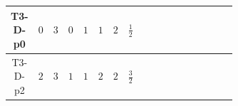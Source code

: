 \documentclass[8pt]{article}
\begin{document}
\begin{landscape}
\begin{longtable}{@{}cccccccc >{\raggedright\arraybackslash}p{0.21\linewidth} >{\raggedright\arraybackslash}p{0.21\linewidth} >{\raggedright\arraybackslash}p{0.21\linewidth}@{}}
T3-D-p0 & $0$ & $3$ & $0$ & $1$ & $1$ & $2$ & $\frac{1}{2}$ & \scriptsize\adjustbox{max width=\linewidth}{$\begin{gathered} -S_{1,j_1} S_{1,j_1}{}^{\dagger } m_1^2 \\ +\frac{1}{2} S_{1,j_3} S_{1,j_4} S_{1,j_1}{}^{\dagger } S_{1,j_2}{}^{\dagger } \mathcal{I}_{S_1,j_1,j_3,j_2,j_4}{}^1 \lambda_{S_1}^{(1)}^{(1)} \\ +\frac{1}{2} S_{1,j_3} S_{1,j_4} S_{1,j_1}{}^{\dagger } S_{1,j_2}{}^{\dagger } \mathcal{I}_{S_1,j_1,j_3,j_2,j_4}{}^2 \lambda_{S_1}^{(1)}^{(2)}\end{gathered}$} & \scriptsize\adjustbox{max width=\linewidth}{$\begin{gathered} +D_{\mu _1}\left(S_{1,j_1}\right){}^{\dagger } D_{\mu _1}\left(S_{1,j_1}\right)\end{gathered}$} & \scriptsize\adjustbox{max width=\linewidth}{$\begin{gathered} -m_2^2 S_2 S_2{}^{\dagger } \\ +\frac{1}{2} S_2^2 \left(S_2{}^{\dagger }\right){}^2 \lambda_{S_2}^{(1)}^{(1)}\end{gathered}$} \\
\midrule
T3-D-p2 & $2$ & $3$ & $1$ & $1$ & $2$ & $2$ & $\frac{3}{2}$ & \scriptsize\adjustbox{max width=\linewidth}{$\begin{gathered} -S_{1,j_1} S_{1,j_1}{}^{\dagger } m_1^2 \\ +\frac{1}{2} S_{1,j_3} S_{1,j_4} S_{1,j_1}{}^{\dagger } S_{1,j_2}{}^{\dagger } \mathcal{I}_{S_1,j_1,j_3,j_2,j_4}{}^1 \lambda_{S_1}^{(1)}^{(1)} \\ +\frac{1}{2} S_{1,j_3} S_{1,j_4} S_{1,j_1}{}^{\dagger } S_{1,j_2}{}^{\dagger } \mathcal{I}_{S_1,j_1,j_3,j_2,j_4}{}^2 \lambda_{S_1}^{(1)}^{(2)}\end{gathered}$} & \scriptsize\adjustbox{max width=\linewidth}{$\begin{gathered} +D_{\mu _1}\left(S_{1,j_1}\right){}^{\dagger } D_{\mu _1}\left(S_{1,j_1}\right)\end{gathered}$} & \scriptsize\adjustbox{max width=\linewidth}{$\begin{gathered} -m_2^2 S_2 S_2{}^{\dagger } \\ +\frac{1}{2} S_2^2 \left(S_2{}^{\dagger }\right){}^2 \lambda_{S_2}^{(1)}^{(1)}\end{gathered}$} \\
\midrule

\end{longtable}
\end{landscape}
\end{document}
